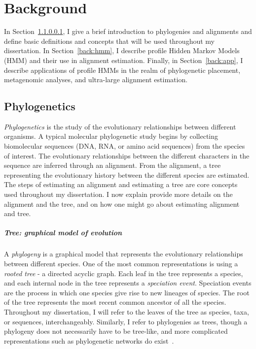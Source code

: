 \chapter{Background}
\label{background}%
In Section~\ref{back:phylogenetics}, I give a brief introduction to phylogenies and alignments and define basic definitions and concepts that will be used throughout my dissertation.  In Section~\ref{back:hmm}, I describe profile Hidden Markov Models (HMM) and their use in alignment estimation. Finally, in Section~\ref{back:app}, I describe applications of profile HMMs in the realm of phylogenetic placement, metagenomic analyses, and ultra-large alignment estimation.

\section{Phylogenetics}
\emph{Phylogenetics} is the study of the evolutionary relationships between different organisms.  A typical molecular phylogenetic study begins by collecting biomolecular sequences (DNA, RNA, or amino acid sequences) from the species of interest.  The evolutionary relationships between the different characters in the sequence are inferred through an alignment.  From the alignment, a tree representing the evolutionary history between the different species are estimated.  The steps of estimating an alignment and estimating a tree are core concepts used throughout my dissertation.  I now explain provide more details on the alignment and the tree, and on how one might go about estimating alignment and tree.

\paragraph{Tree: graphical model of evolution}\label{back:phylogenetics}
A \emph{phylogeny} is a graphical model that represents the evolutionary relationships between different species.  One of the most common representations is using a \emph{rooted tree} - a directed acyclic graph.  Each leaf in the tree represents a species, and each internal node in the tree represents a \emph{speciation event}.  Speciation events are the process in which one species give rise to new lineages of species.  The root of the tree represents the most recent common ancestor of all the species.  Throughout my dissertation, I will refer to the leaves of the tree as species, taxa, or sequences, interchangeably.  Similarly, I refer to phylogenies as trees, though a phylogeny does not necessarily have to be tree-like, and more complicated representations such as phylogenetic networks do exist~\cite{todo}.

